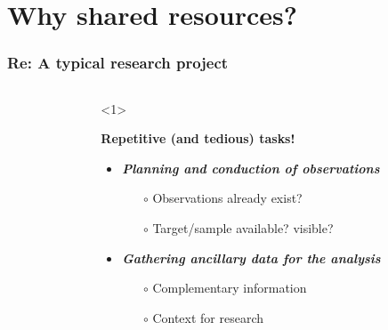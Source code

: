 \section{Why shared resources?}


\begin{frame}
  \frametitle{Re: A typical research project}

  \begin{columns}[T]

    \begin{column}{.4\textwidth}
      \begin{overlayarea}{\textwidth}{\textheight}
      \end{overlayarea}
    \end{column}


    \begin{column}{.6\textwidth}
      \begin{overlayarea}{\textwidth}{\textheight}
        \begin{onlyenv}<1>

          \vspace{1em}
          \textbf{\bf Repetitive (and tedious) tasks!}\\
          \vspace{1em}
          \begin{itemize}[<.->]
            \item \emph{\bf Planning and conduction of observations}
              \begin{itemize}[<.->]
                \item[$\circ$] Observations already exist?
                \item[$\circ$] Target/sample available? visible?
              \end{itemize}

            \vspace{0.5em}
            \item \emph{\bf Gathering ancillary data for the analysis}
              \begin{itemize}[<.->]
                \item[$\circ$] Complementary information 
                \item[$\circ$] Context for research 
              \end{itemize}


\end{itemize}
\end{onlyenv}
\end{overlayarea}
\end{column}
\end{columns}
\end{frame}
